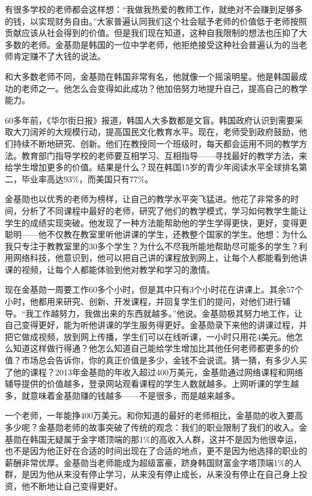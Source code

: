 有很多学校的老师都会这样想：“我做我热爱的教师工作，就绝对不会赚到足够多的钱，以实现财务自由。”大家普遍认同我们这个社会赋予老师的价值低于老师按照贡献应该从社会得到的价值。但是我们现在知道，这种自我限制的想法也压抑了大多数的老师。金基勋是韩国的一位中学老师，他拒绝接受这种社会普遍认为的当老师肯定赚不了大钱的说法。

和大多数老师不同，金基勋在韩国非常有名，他就像一个摇滚明星。他是韩国最成功的老师之一。他怎么会变得如此成功？他加倍努力地提升自己，提高自己的教学能力。

60多年前，《华尔街日报》报道，韩国人大多数都是文盲。韩国政府认识到需要采取大刀阔斧的大规模行动，提高国民文化教育水平。现在，老师受到政府鼓励，他们持续不断地研究、创新。他们在教授同一个班级时，每天都会运用不同的教学方法。教育部门指导学校的老师要互相学习、互相指导——寻找最好的教学方法，来给学生增加更多的价值。结果是什么？现在韩国15岁的青少年阅读水平全球排名第二，毕业率高达93\%，而美国只有77\%。

金基勋也以优秀的老师为榜样，让自己的教学水平突飞猛进。他花了非常多的时间，分析了不同课程中最好的老师，研究了他们的教学模式，学习如何教学生能让学生的成绩实现突破。他发现了一种方法能帮助他的学生学得更快，更好，变得更聪明——他不仅教在教室里听他讲课的学生，还教整个国家的学生。他想：为什么我只专注于教教室里的30多个学生？为什么不尽我所能地帮助尽可能多的学生？利用网络科技，他意识到，他可以把自己讲的课程放到网上，让每个人都能看到他讲课的视频，让每个人都能体验到他对教学和学习的激情。

现在金基勋一周要工作60多个小时，但是其中只有3个小时花在讲课上。其余57个小时，他都用来研究、创新、开发课程，并回复学生们的提问，对他们进行辅导。“我工作越努力，我做出来的东西就越多。”他说。金基勋极其努力地工作，让自己变得更好，能为听他讲课的学生服务得更好。金基勋录下来他的讲课过程，并把它做成视频，放到网上传播，学生们可以在线听课，一小时只用花4美元。他怎么知道这样做行得通？他怎么知道自己能给学生增加比其他任何老师都更多的价值？市场总会告诉你，你的真正价值是多少，金钱不会说谎。猜一猜，有多少人买了他的课程？2013年金基勋的年收入超过400万美元，金基勋通过网络课程和网络辅导提供的价值越多，登录网站观看课程的学生人数就越多。上网听课的学生越多，就意味着金基勋赚的钱越多——不是很多，而是越来越多。

一个老师，一年能挣400万美元。和你知道的最好的老师相比，金基勋的收入要高多少呢？金基勋老师的故事突破了传统的观念：我们的职业限制了我们的收入。金基勋在韩国无疑属于金字塔顶端的那1\%的高收入人群，这并不是因为他很幸运，也不是因为他正好在合适的时间出现在了合适的地点，更不是因为他选择的职业的薪酬非常优厚。金基勋当老师能成为超级富豪，跻身韩国财富金字塔顶端1\%的人群，是因为他从来没有停止学习，从来没有停止成长，从来没有停止在自己身上投资，他不断地让自己变得更好。

